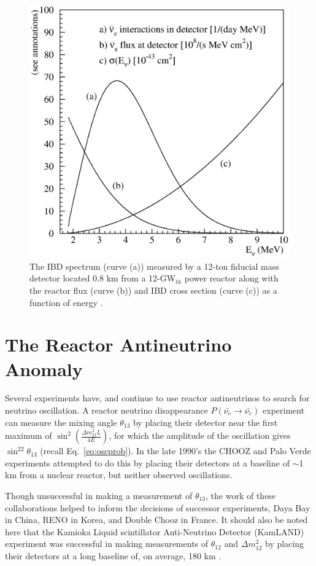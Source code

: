 \begin{figure}[!t]
	\centering
	\includegraphics[width=0.55\linewidth]{tex/3-reactorneutrinos-images/vogel-fig02}
	\caption{The IBD spectrum (curve (a)) measured by a 12-ton fiducial mass detector located 0.8 km from a 12-GW$_{th}$ power reactor along with the reactor flux (curve (b)) and IBD cross section (curve (c)) as a function of energy \cite{PDG}.}
	\label{fig:vogel-fig02}
\end{figure}


\section{The Reactor Antineutrino Anomaly}

Several experiments have, and continue to use reactor antineutrinos to search for neutrino oscillation. 
A reactor neutrino disappearance $P(\bar{\nu_{e}} \rightarrow \bar{\nu_{e}})$ experiment can measure the mixing angle $\theta_{13}$ by placing their detector near the first maximum of $\sin^2\left(\frac{\Delta m^2_{31}L}{4E}\right)$, for which the amplitude of the oscillation gives $\sin^22\theta_{13}$ (recall Eq.~\ref{eq:oscprob}).
In the late 1990's the CHOOZ \cite{Apollonio:1999ae,Apollonio:2002gd} and Palo Verde \cite{Boehm:2001ik} experiments attempted to do this by placing their detectors at a baseline of $\sim$1 km from a nuclear reactor, but neither observed oscillations.

Though unsuccessful in making a measurement of $\theta_{13}$, the work of these collaborations helped to inform the decisions of successor experiments, Daya Bay in China, RENO in Korea, and Double Chooz in France. 
It should also be noted here that the Kamioka Liquid scintillator Anti-Neutrino Detector (KamLAND) experiment was successful in making measurements of $\theta_{12}$ and $\Delta m^2_{12}$  by placing their detectors at a long baseline of, on average, 180 km \cite{Eguchi:2002dm, Araki:2004mb}.

